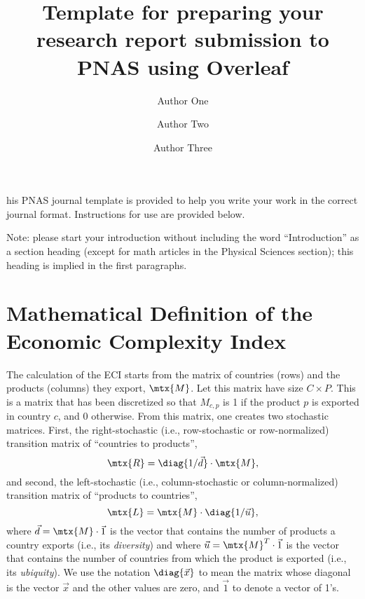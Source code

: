 \documentclass[9pt,twocolumn,twoside,lineno]{pnas-new}
\title{Template for preparing your research report submission to PNAS using Overleaf}
\author[a,c,1]{Author One}
\author[b,1,2]{Author Two}
\author[a]{Author Three}
\affil[a]{Affiliation One}
\affil[b]{Affiliation Two}
\affil[c]{Affiliation Three}
\begin{document}
\verticaladjustment{-2pt}

\maketitle
\thispagestyle{firststyle}

his PNAS journal template is provided to help you write your work in the correct journal format.  Instructions for use are provided below.

Note: please start your introduction without including the word ``Introduction'' as a section heading (except for math articles in the Physical Sciences section); this heading is implied in the first paragraphs. 



\section{Mathematical Definition of the Economic Complexity Index}
\label{sec:ECIdefinition}
The calculation of the ECI starts from the matrix of countries (rows) and the products (columns) they export, $\mtx{M}$. Let this matrix have size $C\times P$. This is a matrix that has been discretized so that $M_{c,p}$ is 1 if the product $p$ is exported in country $c$, and 0 otherwise. From this matrix, one creates two stochastic matrices. First, the right-stochastic (i.e., row-stochastic or row-normalized) transition matrix of ``countries to products'', $$\mtx{R}=\diag{1/\vec{d}}\cdot\mtx{M},$$ and second, the left-stochastic (i.e., column-stochastic or column-normalized) transition matrix of ``products to countries'', $$\mtx{L}=\mtx{M}\cdot\diag{1/\vec{u}},$$ where $\vec{d}=\mtx{M}\cdot\vec{1}$ is the vector that contains the number of products a country exports (i.e., its \emph{diversity}) and where $\vec{u}=\mtx{M}^T\cdot\vec{1}$ is the vector that contains the number of countries from which the product is exported (i.e., its \emph{ubiquity}). We use the notation $\diag{\vec{x}}$ to mean the matrix whose diagonal is the vector $\vec{x}$ and the other values are zero, and $\vec{1}$ to denote a vector of 1's.
\end{document}
